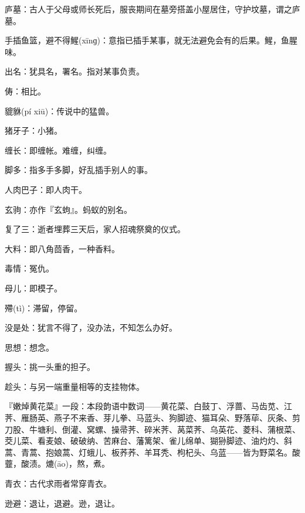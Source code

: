 \startbuffer[2254]
庐墓：古人于父母或师长死后，服丧期间在墓旁搭盖小屋居住，守护坟墓，谓之庐墓。
\stopbuffer


\startbuffer[2255]
手插鱼篮，避不得鯹(xīnɡ)：意指已插手某事，就无法避免会有的后果。鯹，鱼腥味。
\stopbuffer


\startbuffer[2256]
出名：犹具名，署名。指对某事负责。
\stopbuffer


\startbuffer[2257]
俦：相比。
\stopbuffer


\startbuffer[2258]
貔貅(pí xiū)：传说中的猛兽。
\stopbuffer


\startbuffer[2259]
猪牙子：小猪。
\stopbuffer


\startbuffer[2260]
缠长：即缠帐。难缠，纠缠。
\stopbuffer


\startbuffer[2261]
脚多：指多手多脚，好乱插手别人的事。
\stopbuffer


\startbuffer[2262]
人肉巴子：即人肉干。
\stopbuffer


\startbuffer[2263]
玄驹：亦作『玄蚼』。蚂蚁的别名。
\stopbuffer


\startbuffer[2264]
复了三：逝者埋葬三天后，家人招魂祭奠的仪式。
\stopbuffer


\startbuffer[2265]
大料：即八角茴香，一种香料。
\stopbuffer


\startbuffer[2266]
毒情：冤仇。
\stopbuffer


\startbuffer[2267]
母儿：即模子。
\stopbuffer


\startbuffer[2268]
殢(tì)：滞留，停留。
\stopbuffer


\startbuffer[2269]
没是处：犹言不得了，没办法，不知怎么办好。
\stopbuffer


\startbuffer[2270]
思想：想念。
\stopbuffer


\startbuffer[2271]
握头：挑一头重的担子。
\stopbuffer


\startbuffer[2272]
趁头：与另一端重量相等的支挂物体。
\stopbuffer


\startbuffer[2273]
『嫩焯黄花菜』一段：本段韵语中数词——黄花菜、白鼓丁、浮蔷、马齿苋、江荠、雁肠英、燕子不来香、芽儿拳、马蓝头、狗脚迹、猫耳朵、野落荜、灰条、剪刀股、牛塘利、倒灌、窝螺、操帚荠、碎米荠、莴菜荠、乌英花、菱科、蒲根菜、茭儿菜、看麦娘、破破纳、苦麻台、藩篱架、雀儿绵单、猢狲脚迹、油灼灼、斜蒿、青蒿、抱娘蒿、灯蛾儿、板荞荞、羊耳秃、枸杞头、乌蓝——皆为野菜名。酸虀，酸渍。熝(āo)，熬，煮。
\stopbuffer


\startbuffer[2274]
青衣：古代求雨者常穿青衣。
\stopbuffer


\startbuffer[2275]
逊避：退让，退避。逊，退让。
\stopbuffer


